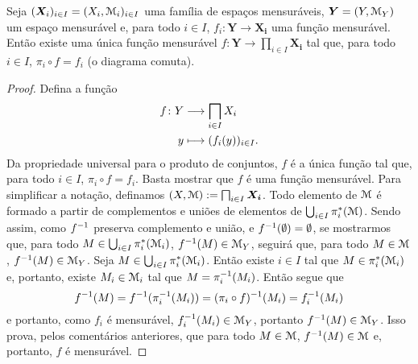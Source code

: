 \begin{proposition}
Seja $(\bm X_i)_{i \in I} = (X_i,\mathcal{M}_i)_{i \in I}$ uma família de espaços mensuráveis, $\bm Y = (Y,\mathcal{M}_Y)$ um espaço mensurável e, para todo $i \in I$, $f_i: \bm Y \to \bm{X_i}$ uma função mensurável. Então existe uma única função mensurável $f: \bm Y \to \prod_{i \in I} \bm{X_i}$ tal que, para todo $i \in I$, $\pi_i \circ f = f_i$ (o diagrama comuta).
\begin{figure}
\centering
{}
\end{figure}
\end{proposition}
\begin{proof}
Defina a função
	\begin{align*}
	\func{f}{Y}{\prod_{i \in I} X_i}{y}{(f_i(y))_{i \in I}}.
	\end{align*}
Da propriedade universal para o produto de conjuntos, $f$ é a única função tal que, para todo $i \in I$, $\pi_i \circ f = f_i$. Basta mostrar que $f$ é uma função mensurável. Para simplificar a notação, definamos $(X,\mens) := \prod_{i \in I} \bm{X_i}$. Todo elemento de $\mathcal{M}$ é formado a partir de complementos e uniões de elementos de $\bigcup_{i \in I} \pi_i^*(\mathcal{M})$. Sendo assim, como $f^{-1}$ preserva complemento e união, e $f^{-1}(\emptyset)=\emptyset$, se mostrarmos que, para todo $M \in \bigcup_{i \in I} \pi_i^*(\mathcal{M}_i)$, $f^{-1}(M) \in \mathcal{M}_Y$, seguirá que, para todo $M \in \mathcal{M}$, $f^{-1}(M) \in \mathcal{M}_Y$. Seja $M \in \bigcup_{i \in I} \pi_i^*(\mathcal{M}_i)$. Então existe $i \in I$ tal que $M \in \pi_i^*(\mathcal{M}_i)$ e, portanto, existe $M_i \in \mathcal{M}_i$ tal que $M=\pi_i^{-1}(M_i)$. Então segue que
	\begin{equation*}
	f^{-1}(M) = f^{-1}(\pi_i^{-1}(M_i)) = (\pi_i \circ f)^{-1}(M_i) = f_i^{-1}(M_i)
	\end{equation*}
e portanto, como $f_i$ é mensurável, $f_i^{-1}(M_i) \in \mathcal{M}_Y$, portanto $f^{-1}(M) \in \mathcal{M}_Y$. Isso prova, pelos comentários anteriores, que para todo $M \in \mathcal{M}$, $f^{-1}(M) \in \mathcal{M}$ e, portanto, $f$ é mensurável.
\end{proof}









